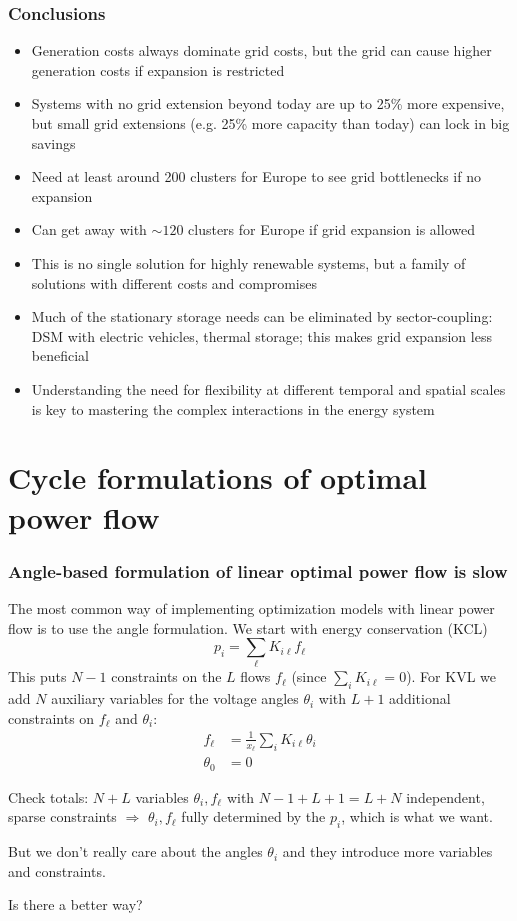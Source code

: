 \documentclass[10pt,aspectratio=169,dvipsnames]{beamer}
\let\olditem\item
\renewcommand{\item}{%
\olditem\vspace{5pt}}
\begin{document}
\begin{frame}
  \frametitle{Conclusions}

  \begin{itemize}
    \item Generation costs always dominate grid costs, but the grid can cause higher generation costs if expansion is restricted
    \item Systems with no grid extension beyond today are up to 25\% more expensive, but small grid extensions (e.g. 25\% more capacity than today) can lock in big savings
    \item Need at least around 200 clusters for Europe to see grid bottlenecks if no expansion
    \item Can get away with $\sim 120$ clusters for Europe if grid expansion is allowed
    \item This is \alert{no single solution} for highly renewable systems, but a \alert{family of solutions}  with different costs and compromises
    \item Much of the stationary storage needs can be eliminated by sector-coupling: DSM with electric vehicles, thermal storage; this makes grid expansion less beneficial
    \item Understanding the need for \alert{flexibility at different temporal and spatial scales} is key to mastering the complex interactions in the energy system
  \end{itemize}
\end{frame}

\section{Cycle formulations of optimal power flow}

\begin{frame}
  \frametitle{Angle-based formulation of linear optimal power flow is slow}

  The most common way of implementing optimization models with linear power flow is to use the \alert{angle formulation}.
  We start with energy conservation (KCL)
  \begin{equation*}
    p_i = \sum_{\ell} K_{i\ell}f_\ell
  \end{equation*}
  This puts $N-1$ constraints on the $L$ flows $f_\ell$ (since $\sum_i K_{i\ell} = 0$). For KVL we add $N$ \alert{auxiliary variables} for the voltage angles $\theta_i$ with $L+1$ additional constraints on $f_\ell$ and $\theta_i$:
  \begin{align*}
    f_\ell  & = \frac{1}{x_\ell}\sum_{i} K_{i\ell} \theta_i \\
    \theta_0 & = 0
  \end{align*}

  Check totals: $N+L$ variables $\theta_i,f_\ell$ with $N-1 + L+1 = L+N$ independent, sparse constraints $\Rightarrow$ $\theta_i,f_\ell$ fully determined by the $p_i$, which is what we want.

  But we don't really care about the angles $\theta_i$ and they introduce more variables and constraints.

  \alert{Is there a better way?}

\end{frame}
\end{document}
